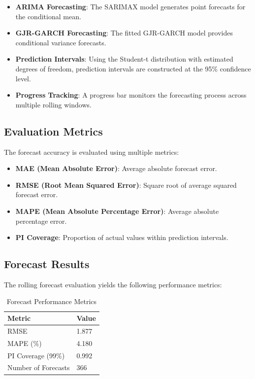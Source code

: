 \documentclass[letterpaper]{article} %
\begin{document}
\begin{itemize}
\item \textbf{ARIMA Forecasting}: The SARIMAX model generates point forecasts for the conditional mean.
\item \textbf{GJR-GARCH Forecasting}: The fitted GJR-GARCH model provides conditional variance forecasts.
\item \textbf{Prediction Intervals}: Using the Student-t distribution with estimated degrees of freedom, prediction intervals are constructed at the 95\% confidence level.
\item \textbf{Progress Tracking}: A progress bar monitors the forecasting process across multiple rolling windows.
\end{itemize}

\subsection{Evaluation Metrics}

The forecast accuracy is evaluated using multiple metrics:

\begin{itemize}
\item \textbf{MAE (Mean Absolute Error)}: Average absolute forecast error.
\item \textbf{RMSE (Root Mean Squared Error)}: Square root of average squared forecast error.
\item \textbf{MAPE (Mean Absolute Percentage Error)}: Average absolute percentage error.
\item \textbf{PI Coverage}: Proportion of actual values within prediction intervals.
\end{itemize}

\subsection{Forecast Results}

The rolling forecast evaluation yields the following performance metrics:

\begin{table}[h]
\centering
\caption{Forecast Performance Metrics}
\label{tab:forecast_metrics}
\begin{tabular}{ll}
\hline
Metric & Value \\
\hline
RMSE & 1.877 \\
MAPE (\%) & 4.180 \\
PI Coverage (99\%) & 0.992 \\
Number of Forecasts & 366 \\
\hline
\end{tabular}
\end{table}
\end{document}
